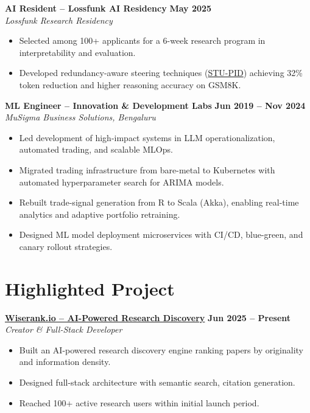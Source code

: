\documentclass[11pt]{article}
\begin{document}
\textbf{AI Resident – Lossfunk AI Residency} \hfill \textbf{May 2025}\\
\textit{Lossfunk Research Residency}
\begin{itemize}[leftmargin=*,nosep]
\item Selected among 100+ applicants for a 6-week research program in interpretability and evaluation.
\item Developed redundancy-aware steering techniques (\href{https://arxiv.org/abs/2506.18831}{STU-PID}) achieving 32\% token reduction and higher reasoning accuracy on GSM8K.

\end{itemize}

\textbf{ML Engineer – Innovation \& Development Labs} \hfill \textbf{Jun 2019 – Nov 2024}\\
\textit{MuSigma Business Solutions, Bengaluru}
\begin{itemize}[leftmargin=*,nosep]
\item Led development of high-impact systems in LLM operationalization, automated trading, and scalable MLOps.
\item Migrated trading infrastructure from bare-metal to Kubernetes with automated hyperparameter search for ARIMA models.
\item Rebuilt trade-signal generation from R to Scala (Akka), enabling real-time analytics and adaptive portfolio retraining.
\item Designed ML model deployment microservices with CI/CD, blue-green, and canary rollout strategies.
\end{itemize}

\section{Highlighted Project}
\textbf{\href{https://wiserank.io}{Wiserank.io – AI-Powered Research Discovery}} \hfill \textbf{Jun 2025 – Present}\\
\textit{Creator \& Full-Stack Developer}
\begin{itemize}[leftmargin=*,nosep]
\item Built an AI-powered research discovery engine ranking papers by originality and information density.
\item Designed full-stack architecture with semantic search, citation generation.
\item Reached 100+ active research users within initial launch period.
\end{itemize}
\end{document}
